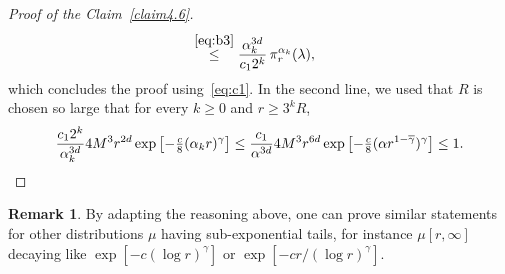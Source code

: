 \documentclass[10pt]{amsart}
\theoremstyle{definition}\newtheorem{defi}[theo]{Definition}\newtheorem{rema}[theo]{Remark}\newtheorem{exam}[theo]{Example}\newtheorem{exem}[theo]{Example}\newtheorem{nota}[theo]{Notation}
\begin{document}
\begin{proof}[{Proof of the Claim~\ref{claim4.6}}]
\begin{align*}
&\stackrel{\eqref{eq:b3}}\le \frac{\alpha_k^{3d}}{c_12^k}\,\pi_r^{\alpha_k}(\lambda),
\end{align*}
which concludes the proof using~\eqref{eq:c1}. In the second line, we used that $R$ is chosen so large that for every $k\ge0$ and $r\ge 3^k R$,
\begin{equation}\label{eq:b3}
\frac {c_1 2^k}{\alpha_k^{3d}} 4 M^3 r^{2d} \exp \left[-\tfrac c8(\alpha_kr)^\gamma\right] \leq \frac {c_1}{\alpha^{3d}} 4 M^3 r^{6d} \exp \left[-\tfrac c8 (\alpha r^{1-\overline\gamma})^\gamma\right] \leq 1.\qedhere
\end{equation}
\end{proof}\let\qed\relax


\begin{rema}
By adapting the reasoning above, one can prove similar statements for other distributions $\mu$ having sub-exponential tails, for instance $\mu[r,\infty]$ decaying like $\exp[-c(\log r)^\gamma]$ or $\exp[-cr/(\log r)^\gamma]$.
\end{rema}
\end{document}
